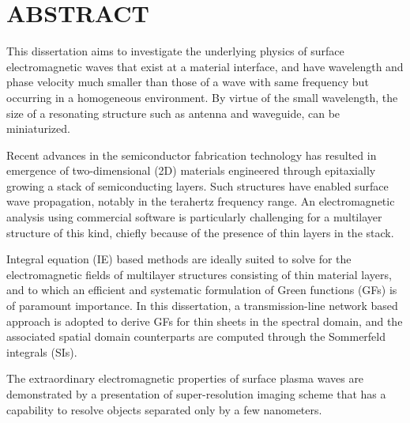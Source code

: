 %
%
%

\chapter*{ABSTRACT}

\pagestyle{plain} %
\setcounter{page}{2}

\indent This dissertation aims to investigate the underlying physics of surface electromagnetic waves that exist at a material interface, and have wavelength and phase velocity much smaller than those of a wave with same frequency but occurring in a homogeneous environment. By virtue of the small wavelength, the size of a resonating structure such as antenna and waveguide, can be miniaturized.

Recent advances in the semiconductor fabrication technology has resulted in emergence of two-dimensional (2D) materials engineered through epitaxially growing a stack of semiconducting layers. Such structures have enabled surface wave propagation, notably in the terahertz frequency range. An electromagnetic analysis using commercial software is particularly challenging for a multilayer structure of this kind, chiefly because of the presence of thin layers in the stack.

Integral equation (IE) based methods are ideally suited to solve for the electromagnetic fields of multilayer structures consisting of thin material layers, and to which an efficient and systematic formulation of Green functions (GFs) is of paramount importance. In this dissertation, a transmission-line network based approach is adopted to derive GFs for thin sheets in the spectral domain, and the associated spatial domain counterparts are computed through the Sommerfeld integrals (SIs).

The extraordinary electromagnetic properties of surface plasma waves are demonstrated by a presentation of super-resolution imaging scheme that has a capability to resolve objects separated only by a few nanometers.


